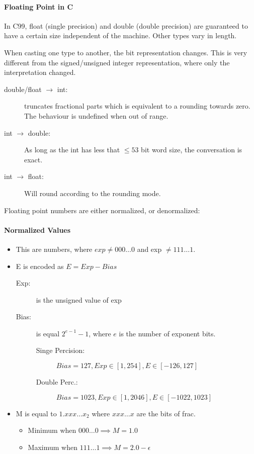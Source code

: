 \paragraph{Floating Point in C}
In C99, float (single precision) and double (double precision) are guaranteed to have a certain size independent of the machine. Other types vary in length.

When casting one type to another, the bit representation changes. This is very different from the signed/unsigned integer representation, where only the interpretation changed.
\begin{description}
    \item[double/float $\to$ int:] truncates fractional parts which is equivalent to a rounding towards zero. The behaviour is undefined when out of range.
    \item[int $\to$ double:] As long as the int has less that $\le 53$ bit word size, the conversation is exact.
    \item[int $\to$ float:] Will round according to the rounding mode.
\end{description}

Floating point numbers are either normalized, or denormalized:
\paragraph{Normalized Values}

\begin{itemize}
    \item This are numbers, where $exp \neq 000 \dots 0$ and exp $\neq 111 \dots 1$.
    \item E is encoded as $E = Exp - Bias$ 
        \begin{description}
            \item[Exp:] is the unsigned value of exp
            \item[Bias:] is equal $2^{e-1} - 1$, where $e$ is the number of exponent bits.
                \begin{description}
                    \item[Singe Percision:] $Bias = 127, Exp \in [1, 254], E \in [-126, 127]$
                    \item[Double Perc.:] $Bias = 1023, Exp \in [1, 2046], E \in [-1022, 1023]$
                \end{description}
        \end{description}
    \item M is equal to $1.xxx \dots x_2$ where $xxx \dots x$ are the bits of frac.
        \begin{itemize}
            \item Minimum when $000 \dots 0 \implies M = 1.0$
            \item Maximum when $111 \dots 1 \implies M = 2.0 - \epsilon$
        \end{itemize}
\end{itemize}


